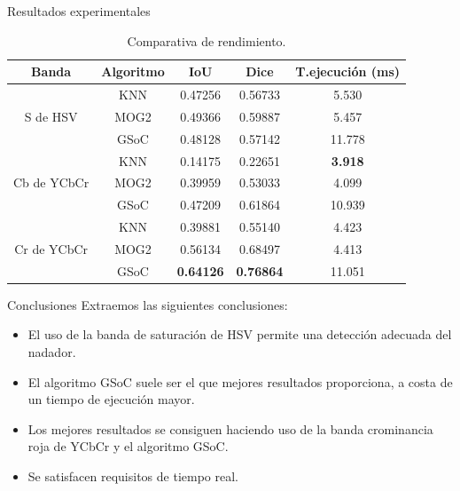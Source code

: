 \documentclass[11pt]{beamer}
\begin{document}
        \begin{frame}{Resultados experimentales}
            \begin{table}
                \centering
                \small
                \begin{tabular}{| c | c | c | c | c|}\hline
                    Banda & Algoritmo & IoU & Dice & T.ejecución (ms) \\ \hline
                    \multirow{3}{*}{S de HSV} & KNN  & 0.47256 & 0.56733 & 5.530 \\
                    &MOG2 & 0.49366 & 0.59887 & 5.457 \\
                    &GSoC & 0.48128 & 0.57142 & 11.778 \\ \hline
                    \multirow{3}{*}{Cb de YCbCr} & KNN  & 0.14175 & 0.22651 & \textbf{3.918} \\
                    &MOG2 & 0.39959 & 0.53033 & 4.099 \\
                    &GSoC & 0.47209 & 0.61864 & 10.939 \\ \hline
                    \multirow{3}{*}{Cr de YCbCr} & KNN  & 0.39881 & 0.55140 & 4.423 \\
                    &MOG2 & 0.56134 & 0.68497 & 4.413 \\
                    &GSoC & \textbf{0.64126} & \textbf{0.76864} & 11.051 \\ \hline
                \end{tabular}
                \caption{Comparativa de rendimiento.}
                \label{tab:rendimientofondoscap3}
            \end{table}
        \end{frame}
         
        \begin{frame}{Conclusiones}
        Extraemos las siguientes conclusiones:
            \begin{itemize}
                \item El uso de la banda de saturación de HSV permite una detección adecuada del nadador.
                \item El algoritmo GSoC suele ser el que mejores resultados proporciona, a costa de un tiempo de ejecución mayor.
                \item Los mejores resultados se consiguen haciendo uso de la banda crominancia roja de YCbCr y el algoritmo GSoC.
                \item Se satisfacen requisitos de tiempo real.
            \end{itemize}
        \end{frame}
        
\end{document}

